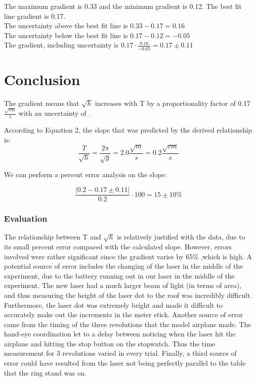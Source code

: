\documentclass[10pt, letterpaper]{article}
\begin{document}
The maximum gradient is 0.33 and the minimum gradient is 0.12. The best fit line gradient is 0.17. \\
The uncertainty above the best fit line is $0.33 - 0.17 = 0.16$ \\
The uncertainty below the best fit line is $0.17 - 0.12 = -0.05$ \\
The gradient, including uncertainty is $0.17 \cdot \frac{0.16}{-0.05} = \boxed{0.17 \pm 0.11}$

\section{Conclusion}
The gradient means that $\sqrt{h}$ increases with T by a proportionality factor of 0.17 $\frac{\sqrt{cm}}{s}$
with an uncertainty of .

According to Equation 2, the slope that was predicted by the derived relationship is:
\[ \frac{T}{\sqrt{h}} = \frac{2\pi }{\sqrt{g}} = 2.0 \frac{\sqrt{m}}{s} = 0.2 \frac{\sqrt{cm}}{s} \]

We can perform a percent error analysis on the slope:

\[ \frac{|0.2 - 0.17 \pm 0.11|}{0.2} \cdot 100 = 15 \pm 10 \% \]

\subsubsection{Evaluation}
The relationship between T and $\sqrt{h}$ is relatively justified with the data, due to its small percent error compared with the calculated slope.
However, errors involved were rather significant since the gradient varies by 65\% ,which is high. A potential source of error includes the changing of
the laser in the middle of the experiment, due to the battery running out in our laser in the middle of the experiment. The new laser had a much larger
beam of light (in terms of area), and thus measuring the height of the laser dot to the roof was incredibly difficult. Furthermore, the laser dot was
extremely bright and made it difficult to accurately make out the increments in the meter stick. Another source of error came from the timing of the
three revolutions that the model airplane made. The hand-eye coordination let to a delay between noticing when the laser hit the airplane and hitting
the stop button on the stopwatch. Thus the time measurement for 3 revolutions varied in every trial. Finally, a third source of error could have resulted
from the laser not being perfectly parallel to the table that the ring stand was on.
\end{document}
